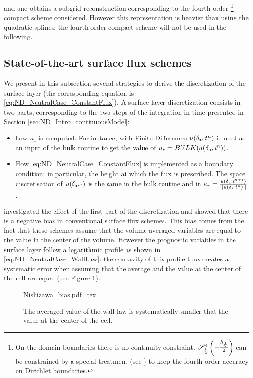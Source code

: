 and one obtains a subgrid reconstruction corresponding to
the fourth-order
\footnote{
On the domain boundaries there is no continuity constraint.
${\cal S}^4_{\frac{1}{2}}\left(-\frac{h_{\frac{1}{2}}}{2}\right)$
can be constrained by a special treatment
(see \citep{piller_finite-volume_2004})
to keep the fourth-order accuracy on Dirichlet boundaries.
}
compact scheme considered.
However this representation is heavier than using the quadratic
splines: the fourth-order compact scheme will not be used in the
following.
\subsection{State-of-the-art surface flux schemes}
\label{sec:ND_NeutralCase_strategies}
We present in this subsection several strategies to derive the
discretization of the surface layer (the corresponding equation
is \eqref{eq:ND_NeutralCase_ConstantFlux}).
A surface layer discretization consists in two parts,
corresponding to the two steps of the integration in time
presented in Section \ref{sec:ND_Intro_continuousModel}:
\begin{itemize}
	\item how $u_\star$ is computed.
		For instance, with Finite Differences
		$u(\delta_{\rm a}, t^n)$ is 
		used as an input of the
		bulk routine to get the value of
		$u_\star = BULK(u(\delta_{\rm a}, t^n))$.
	\item How \eqref{eq:ND_NeutralCase_ConstantFlux}
		is implemented as
		a boundary condition: in particular,
		the height at which the flux is prescribed.
		The space discretisation of
		$u(\delta_{\rm a}, \cdot)$ is the same
		in the bulk routine and in
		$e_\tau= \frac{u(\delta_{\rm a},
		t^{n+1})}
		{||u(\delta_{\rm a}, t^n)||}$.
\end{itemize}
\citep{nishizawa_surface_2018} investigated the effect of the
first part of the discretization and showed that there is a
negative bias in conventional surface flux schemes. This
bias comes from the fact that these schemes assume that the
volume-averaged variables are equal to the value in the center
of the volume. However the prognostic variables in the surface layer
follow a logarithmic profile as shown in
\eqref{eq:ND_NeutralCase_WallLaw}: the concavity of this profile thus
creates a systematic error when assuming that the average and the
value at the center of the cell are equal
(see Figure \ref{fig:ND_NeutralCase_nishizawaBias}).
\begin{figure}
	\centering
	{Nishizawa_bias.pdf_tex}
	\caption{The averaged value of the wall law is
		systematically smaller that the value at
		the center of the cell.}
	\label{fig:ND_NeutralCase_nishizawaBias}
\end{figure}
